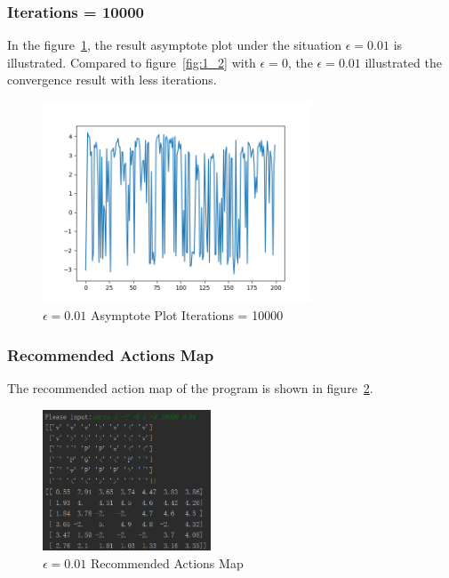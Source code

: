 \documentclass[11pt, a4paper]{article}
\begin{document}
\subsubsection{Iterations = 10000}

In the figure~\ref{fig:4_2}, the result asymptote plot under the situation $\epsilon = 0.01$ is illustrated. Compared to figure~\ref{fig:1_2} with $\epsilon = 0$, the $\epsilon = 0.01$ illustrated the convergence result with less iterations. 

\begin{figure}[htbp] 
	\begin{center}
		\includegraphics[width=8cm]{4_e_2} 
		\caption{$\epsilon = 0.01$ Asymptote Plot Iterations = 10000} 
		\label{fig:4_2}
	\end{center}
\end{figure}

\subsubsection{Recommended Actions Map}

The recommended action map of the program is shown in figure~\ref{fig:4_3}.


\begin{figure}[htbp] 
	\begin{center}
		\includegraphics[width=5cm]{4_map} 
		\caption{$\epsilon = 0.01$ Recommended Actions Map} 
		\label{fig:4_3}
	\end{center}
\end{figure}
\end{document}

